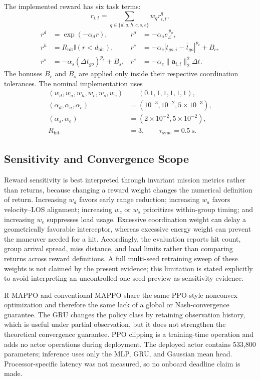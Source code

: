 \documentclass[lettersize,journal]{IEEEtran}
\begin{document}
The implemented reward has six task terms:
\begin{equation}
\label{eq:reward_function}
r_{i,t}=\sum_{q\in\{d,a,h,c,s,e\}}w_q r_{i,t}^{q},
\end{equation}
\begin{align}
r^d&=\exp(-\alpha_d r),&
r^a&=-\alpha_a e_\angle^{\,p_a},\\
r^h&=R_{\mathrm{hit}}\mathbb I(r<d_{\mathrm{hit}}),&
r^c&=-\alpha_c|t_{go,i}-\bar t_{go}|^{p_c}
+B_c,\\
r^s&=-\alpha_s(\Delta t_{go})^{p_s}+B_s,&
r^e&=-\alpha_e\|\mathbf a_{i,t}\|_2^2\Delta t .
\end{align}
The bonuses \(B_c\) and \(B_s\) are applied only inside their respective
coordination tolerances. The nominal implementation uses
\begin{align*}
(w_d,w_a,w_h,w_c,w_s,w_e)&=(0.1,1,1,1,1,1),\\
(\alpha_d,\alpha_a,\alpha_c)&=(10^{-3},10^{-2},5{\times}10^{-3}),\\
(\alpha_s,\alpha_e)&=(2{\times}10^{-2},5{\times}10^{-2}),\\
R_{\mathrm{hit}}&=3,\qquad \tau_{\mathrm{sync}}=0.5~\mathrm{s}.
\end{align*}

\subsection{Sensitivity and Convergence Scope}
\label{subsec:reward_sensitivity}

Reward sensitivity is best interpreted through invariant mission metrics rather
than returns, because changing a reward weight changes the numerical definition
of return. Increasing \(w_d\) favors early range reduction; increasing \(w_a\)
favors velocity--LOS alignment; increasing \(w_c\) or \(w_s\) prioritizes
within-group timing; and increasing \(w_e\) suppresses load usage. Excessive
coordination weight can delay a geometrically favorable interceptor, whereas
excessive energy weight can prevent the maneuver needed for a hit. Accordingly,
the evaluation reports hit count, group arrival spread, miss distance, and load
limits rather than comparing returns across reward definitions. A full
multi-seed retraining sweep of these weights is not claimed by the present
evidence; this limitation is stated explicitly to avoid interpreting an
uncontrolled one-seed preview as sensitivity evidence.

R-MAPPO and conventional MAPPO share the same PPO-style nonconvex optimization
and therefore the same lack of a global or Nash-convergence guarantee. The GRU
changes the policy class by retaining observation history, which is useful under
partial observation, but it does not strengthen the theoretical convergence
guarantee. PPO clipping is a training-time operation and adds no actor operations
during deployment. The deployed actor contains 533,800 parameters; inference
uses only the MLP, GRU, and Gaussian mean head. Processor-specific latency was
not measured, so no onboard deadline claim is made.
\end{document}
